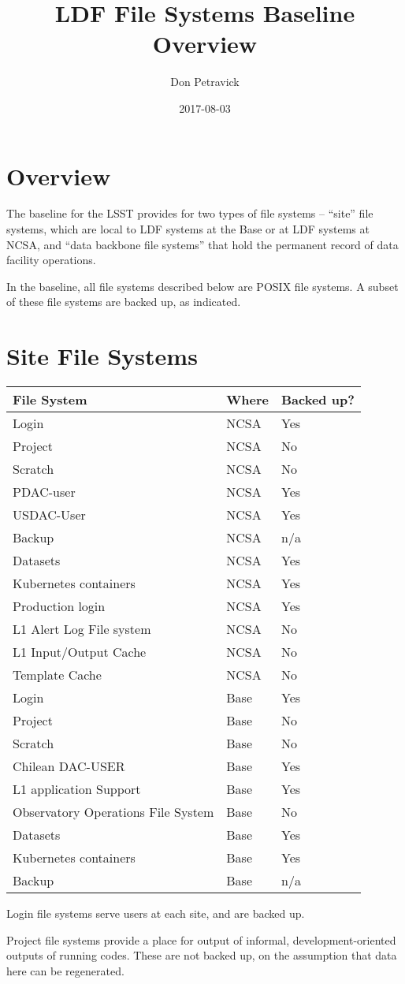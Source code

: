 \documentclass[toc,DM]{lsstdoc}
\title{LDF File Systems Baseline Overview}
\author{Don Petravick}
\date{2017-08-03}
\begin{document}
\maketitle

\section{Overview}

The baseline for the LSST provides for two types of file systems --
``site'' file systems, which are local to LDF systems at the Base or at
LDF systems at NCSA, and ``data backbone file systems'' that hold the
permanent record of data facility operations.

In the baseline, all file systems described below are POSIX file systems. A
subset of these file systems are backed up, as indicated.

\section{Site File Systems}

\begin{longtable}[]{@{}lll@{}}
\hline
\textbf{File System} & \textbf{Where} & \textbf{Backed up?}\tabularnewline
\hline
\endhead
Login & NCSA & Yes\tabularnewline
Project & NCSA & No\tabularnewline
Scratch & NCSA & No\tabularnewline
PDAC-user & NCSA & Yes\tabularnewline
USDAC-User & NCSA & Yes\tabularnewline
Backup & NCSA & n/a\tabularnewline
Datasets & NCSA & Yes\tabularnewline
Kubernetes containers & NCSA & Yes\tabularnewline
Production login & NCSA & Yes\tabularnewline
L1 Alert Log File system & NCSA & No\tabularnewline
L1 Input/Output Cache & NCSA & No\tabularnewline
Template Cache & NCSA & No\tabularnewline
Login & Base & Yes\tabularnewline
Project & Base & No\tabularnewline
Scratch & Base & No\tabularnewline
Chilean DAC-USER & Base & Yes\tabularnewline
L1 application Support & Base & Yes\tabularnewline
Observatory Operations File System & Base & No\tabularnewline
Datasets & Base & Yes\tabularnewline
Kubernetes containers & Base & Yes\tabularnewline
Backup & Base & n/a\tabularnewline
\hline
\end{longtable}

Login file systems serve users at each site, and are backed up.

Project file systems provide a place for output of informal,
development-oriented outputs of running codes. These are not backed up,
on the assumption that data here can be regenerated.
\end{document}
